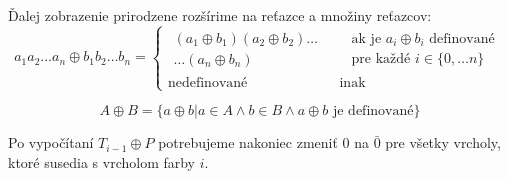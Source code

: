 Ďalej zobrazenie prirodzene rozšírime na reťazce a množiny reťazcov:
\begin{equation}
    a_1 a_2 \ldots a_n \oplus b_1 b_2 \ldots b_n =
      \begin{cases}
          \begin{gathered}
            (a_1 \oplus b_1)(a_2 \oplus b_2) \ldots \\
            \ldots (a_n \oplus b_n)  
          \end{gathered} &
          \begin{aligned}
            & \textrm{ak je } a_i \oplus b_i \textrm{ definované} \\ 
            & \textrm{pre každé } i \in \{0, \ldots n\} 
          \end{aligned} \\
        \textrm{nedefinované} & \textrm{ inak}
      \end{cases}
\end{equation}

$$A \oplus B = \{ a \oplus b | a \in A \wedge b \in B \wedge a \oplus b \textrm{ je definované} \} $$

Po vypočítaní $T_{i-1} \oplus P$ potrebujeme nakoniec zmeniť $0$ na $\bar{0}$ pre všetky vrcholy,
ktoré susedia s vrcholom farby $i$.

